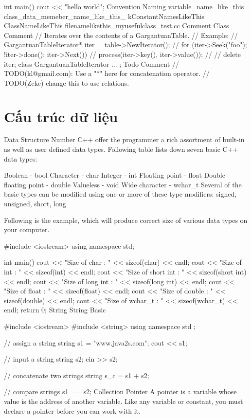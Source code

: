 int main() {
    cout << "hello world";
}
Convention
Naming
variable_name_like_this
class_data_memeber_name_like_this_
kConstantNamesLikeThis
ClassNameLikeThis
filenamelikethis_myusefulclass_test.cc
Comment
Class Comment
// Iterates over the contents of a GargantuanTable.
// Example:
//    GargantuanTableIterator* iter = table->NewIterator();
//    for (iter->Seek("foo"); !iter->done(); iter->Next()) {
//      process(iter->key(), iter->value());
//    }
//    delete iter;
class GargantuanTableIterator {
  ...
};
Todo Comment
// TODO(kl@gmail.com): Use a "*" here for concatenation operator.
// TODO(Zeke) change this to use relations.

\section{Cấu trúc dữ liệu}

Data Structure
Number
C++ offer the programmer a rich assortment of built-in as well as user defined data types. Following table lists down seven basic C++ data types:

Boolean - bool
Character - char
Integer - int
Floating point - float
Double floating point - double
Valueless - void
Wide character - wchar_t
Several of the basic types can be modified using one or more of these type modifiers: signed, unsigned, short, long

Following is the example, which will produce correct size of various data types on your computer.

#include <iostream>
using namespace std;

int main() {
   cout << "Size of char : " << sizeof(char) << endl;
   cout << "Size of int : " << sizeof(int) << endl;
   cout << "Size of short int : " << sizeof(short int) << endl;
   cout << "Size of long int : " << sizeof(long int) << endl;
   cout << "Size of float : " << sizeof(float) << endl;
   cout << "Size of double : " << sizeof(double) << endl;
   cout << "Size of wchar_t : " << sizeof(wchar_t) << endl;
   return 0;
}
String
String Basic

#include <iostream>
#include <string>
using namespace std ;

// assign a string
string s1 = "www.java2s.com\n";
cout << s1;

// input a string
string s2;
cin >> s2;

// concatenate two strings
string s_c = s1 + s2;

// compare strings
s1 == s2;
Collection
Pointer
A pointer is a variable whose value is the address of another variable. Like any variable or constant, you must declare a pointer before you can work with it.

